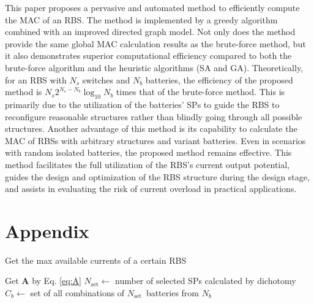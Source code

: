 \documentclass{article}
\begin{document}
This paper proposes a pervasive and automated method to efficiently compute the MAC of an RBS.
The method is implemented by a greedy algorithm combined with an improved directed graph model.
Not only does the method provide the same global MAC calculation results as the brute-force method, but it also demonstrates superior computational efficiency compared to both the brute-force algorithm and the heuristic algorithms (SA and GA). 
Theoretically, for an RBS with $N_s$ switches and $N_b$ batteries, the efficiency of the proposed method is $N_s 2^{N_s - N_b} \log_{10} N_b$ times that of the brute-force method. 
This is primarily due to the utilization of the batteries' SPs to guide the RBS to reconfigure reasonable structures rather than blindly going through all possible structures.
Another advantage of this method is its capability to calculate the MAC of RBSs with arbitrary structures and variant batteries. 
Even in scenarios with random isolated batteries, the proposed method remains effective.
This method facilitates the full utilization of the RBS's current output potential, guides the design and optimization of the RBS structure during the design stage, and assists in evaluating the risk of current overload in practical applications.

\section{Appendix} 

\begin{algorithm}
    \caption{Get the max available currents of a certain RBS}\label{alg:greedy}
    \KwResult{$\max \eta$}
    Get $\bm{A}$ by Eq. \ref{eq:A}\;
    {
        $N_{\text{set}} \leftarrow$ number of selected SPs calculated by dichotomy\;
        $C_b    \leftarrow$ set of all combinations of $N_{\text{set}} $~batteries from $N_b$\;
    }
\end{algorithm}
\end{document}
